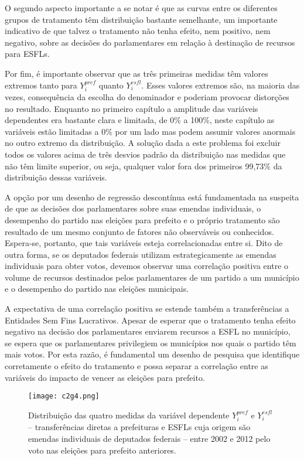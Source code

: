O segundo aspecto importante a se notar é que as curvas entre os diferentes grupos de tratamento têm distribuição bastante semelhante, um importante indicativo de que talvez o tratamento não tenha efeito, nem positivo, nem negativo, sobre as decisões do parlamentares em relação à destinação de recursos para ESFLs.

Por fim, é importante observar que as três primeiras medidas têm valores extremos tanto para $Y_{i}^{pref}$ quanto $Y_{i}^{esfl}$. Esses valores extremos são, na maioria das vezes, consequência da escolha do denominador e poderiam provocar distorções no resultado. Enquanto no primeiro capítulo a amplitude das variáveis dependentes era bastante clara e limitada, de 0\% a 100\%, neste capítulo as variáveis estão limitadas a 0\% por um lado mas podem assumir valores anormais no outro extremo da distribuição. A solução dada a este problema foi excluir todos os valores acima de três desvios padrão da distribuição nas medidas que não têm limite superior, ou seja, qualquer valor fora dos primeiros 99,73\% da distribuição dessas variáveis.

A opção por um desenho de regressão descontínua está fundamentada na suspeita de que as decisões dos parlamentares sobre suas emendas individuais, o desempenho do partido nas eleições para prefeito e o próprio tratamento são resultado de um mesmo conjunto de fatores não observáveis ou conhecidos. Espera-se, portanto, que tais variáveis esteja correlacionadas entre si. Dito de outra forma, se os deputados federais utilizam estrategicamente as emendas individuais para obter votos, devemos observar uma correlação positiva entre o volume de recursos destinados pelos parlamentares de um partido a um município e o desempenho do partido nas eleições municipais.

A expectativa de uma correlação positiva se estende também a transferências a Entidades Sem Fins Lucrativos. Apesar de esperar que o tratamento tenha efeito negativo na decisão dos parlamentares enviarem recursos a ESFL no município, se espera que os parlamentares privilegiem os municípios nos quais o partido têm mais votos. Por esta razão, é fundamental um desenho de pesquisa que identifique corretamente o efeito do tratamento e possa separar a correlação entre as variáveis do impacto de vencer as eleições para prefeito.

\begin{figure}[htp]
	\centering
	\texttt{[image: c2g4.png]}
	\caption{Distribuição das quatro medidas da variável dependente $Y_{i}^{pref}$ e $Y_{i}^{esfl}$ -- transferências diretas a prefeituras e ESFLs cuja origem são emendas individuais de deputados federais -- entre 2002 e 2012 pelo voto nas eleições para prefeito anteriores.}
	\label{fig:c2g4}
\end{figure}

